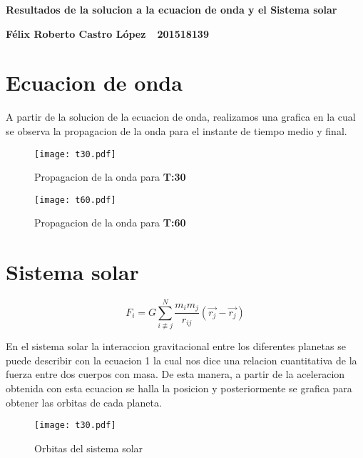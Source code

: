 \documentclass[12pt]{article}
\begin{document}
\textbf{\centering Resultados de la solucion a la ecuacion de onda y el Sistema solar }

\textbf{Félix Roberto Castro López\ \ 201518139}


\section{Ecuacion de onda}

 A partir de la solucion de la ecuacion de onda, realizamos una grafica en la cual se observa la propagacion de la onda para el instante de tiempo medio y final.


\begin{figure}[H]
\centering\texttt{[image: t30.pdf]}
\caption{Propagacion de la onda para \textbf{T:30}}
\end{figure}

\begin{figure}[H]
\centering\texttt{[image: t60.pdf]}
\caption{Propagacion de la onda para \textbf{T:60}}
\end{figure}




\section{Sistema solar}
\begin{equation}
\label{eq:emc}
F_{i}=G \sum_{i\not\equiv j}^{N}\frac{m_{i}m_{j}}{r_{ij}}(\vec{r_{j}}-\vec{r_{j}}) 
\end{equation}

En el sistema solar la interaccion gravitacional entre los diferentes planetas se puede describir con la ecuacion 1 la cual nos dice una relacion cuantitativa de la fuerza entre dos cuerpos con masa. De esta manera, a partir de la aceleracion obtenida con esta ecuacion se halla la posicion y posteriormente se grafica para obtener las orbitas de cada planeta.  

\begin{figure}[H]
\centering\texttt{[image: t30.pdf]}
\caption{Orbitas del sistema solar}
\end{figure}
\end{document}
